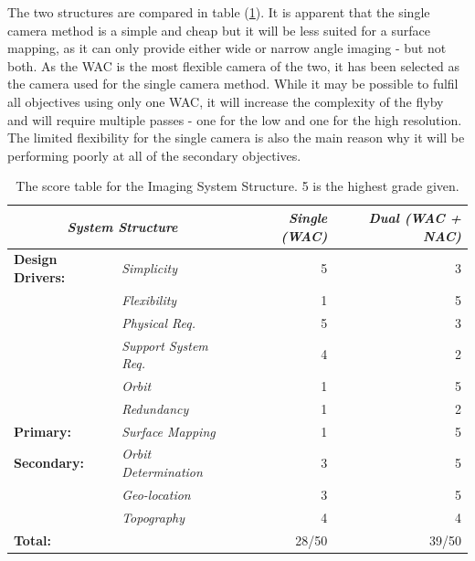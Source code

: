The two structures are compared in table (\ref{tab:score_system_structure}). It is apparent that the single camera method is a simple and cheap but it will be less suited for a surface mapping, as it can only provide either wide or narrow angle imaging - but not both. As the WAC is the most flexible camera of the two, it has been selected as the camera used for the single camera method. While it may be possible to fulfil all objectives using only one WAC, it will increase the complexity of the flyby and will require multiple passes - one for the low and one for the high resolution. The limited flexibility for the single camera is also the main reason why it will be performing poorly at all of the secondary objectives.
\begin{table}[htb]
  \centering
    \begin{tabular}{l|l|rr}
    \multicolumn{2}{c|}{\textit{\textbf{System Structure}}} & \textit{Single (WAC)} & \textit{Dual (WAC + NAC)} \bigstrut[b]\\
    \hline
    \textbf{Design Drivers:} & \textit{Simplicity} & 5     & 3 \bigstrut[t]\\
          & \textit{Flexibility} & 1     & 5 \\
          & \textit{Physical Req.} & 5     & 3 \\
          & \textit{Support System Req.} & 4     & 2 \\
          & \textit{Orbit} & 1     & 5 \\
          & \textit{Redundancy} & 1     & 2 \bigstrut[b]\\
    \hline
    \textbf{Primary:} & \textit{Surface Mapping} & 1     & 5 \bigstrut\\
    \hline
    \textbf{Secondary:} & \textit{Orbit Determination} & 3     & 5 \bigstrut[t]\\
          & \textit{Geo-location} & 3     & 5 \\
          & \textit{Topography} & 4     & 4 \bigstrut[b]\\
    \hline
    \multicolumn{1}{l}{\textbf{Total:}} & \textit{\textbf{}} & 28/50 & 39/50 \bigstrut[t]\\
    \end{tabular}%
  \caption{The score table for the Imaging System Structure. 5 is the highest grade given.}
  \label{tab:score_system_structure}%
\end{table}%

